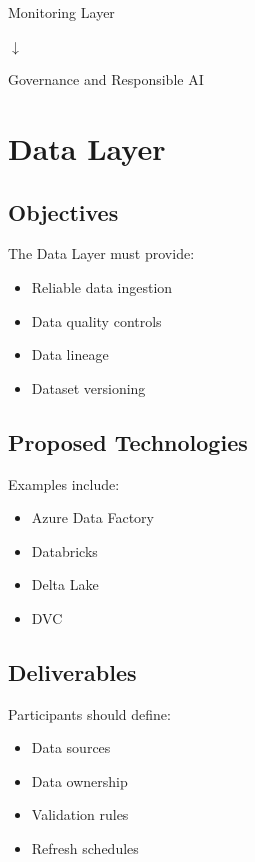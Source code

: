 \begin{center}
Monitoring Layer
\end{center}

\begin{center}
$\downarrow$
\end{center}

\begin{center}
Governance and Responsible AI
\end{center}

\section{Data Layer}

\subsection{Objectives}

The Data Layer must provide:

\begin{itemize}
    \item Reliable data ingestion
    \item Data quality controls
    \item Data lineage
    \item Dataset versioning
\end{itemize}

\subsection{Proposed Technologies}

Examples include:

\begin{itemize}
    \item Azure Data Factory
    \item Databricks
    \item Delta Lake
    \item DVC
\end{itemize}

\subsection{Deliverables}

Participants should define:

\begin{itemize}
    \item Data sources
    \item Data ownership
    \item Validation rules
    \item Refresh schedules
\end{itemize}

